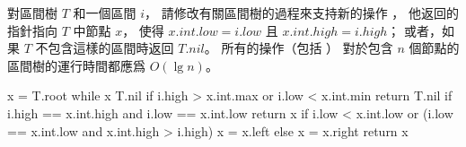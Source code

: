 \startEXERCISE
對區間樹 $T$ 和一個區間 $i$，
請修改有關區間樹的過程來支持新的操作 ，
他返回的指針指向 $T$ 中節點 $x$，
使得 $x.int.low = i.low$ 且 $x.int.high = i.high$；
或者，如果 $T$ 不包含這樣的區間時返回 $T.nil$。
所有的操作（包括 ）
對於包含 $n$ 個節點的區間樹的運行時間都應爲 $O(\lg n)$。
\stopEXERCISE

\startANSWER
{}
\startCLRSCODE
x = T.root
while x \ne T.nil
	if i.high > x.int.max or i.low < x.int.min
		return T.nil
	if i.high == x.int.high and i.low == x.int.low
		return x
	if i.low < x.int.low or
	  (i.low == x.int.low and x.int.high > i.high)
		x = x.left
	else
		x = x.right
return x
\stopCLRSCODE
\stopANSWER
